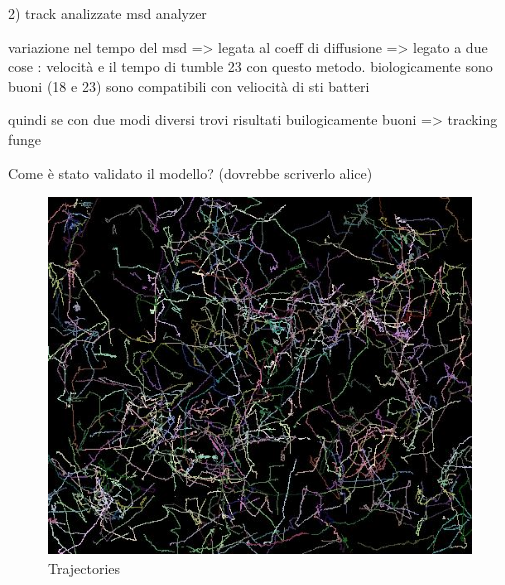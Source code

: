 \documentclass[conference]{IEEEtran}
\begin{document}
2) track analizzate msd analyzer

variazione nel tempo del msd => legata al coeff di diffusione
 => legato a due cose : velocità e il tempo di tumble
 23 con questo metodo. biologicamente sono buoni (18 e 23) sono compatibili con veliocità di sti batteri
 
quindi se con due modi diversi trovi risultati builogicamente buoni => tracking funge




Come è stato validato il modello? (dovrebbe scriverlo alice)

    \begin{figure}
      \begin{center}
        \includegraphics[scale=0.5]{./images/result.png}
        \caption{Trajectories}\label{fig:}
        
      \end{center}
    \end{figure}





\end{document}

